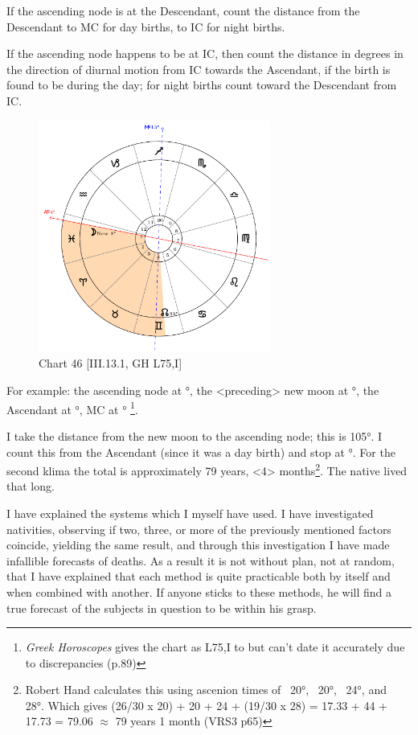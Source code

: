 If the ascending node is at the Descendant, count the distance from the Descendant to MC for day births, to IC for night births. 

If the ascending node happens to be at IC, then count the distance in degrees in the direction of diurnal motion
from IC towards the Ascendant, if the birth is found to be during the day; for night births count toward the Descendant from IC. 

\enlargethispage{2\baselineskip}
\clearpage
\begin{figure}
\centering
\includegraphics[width=0.68\textwidth]{charts/3_13_1}
\caption{Chart 46 [III.13.1, GH L75,I]}
\label{fig:chart46}
\end{figure}

For example: the ascending node at \Gemini\xspace 23°, the <preceding> new moon at \Pisces\xspace 8°, the Ascendant at \Pisces\xspace 4°, MC at \Sagittarius\xspace 13°
\footnote{\textit{Greek Horoscopes} gives the chart as L75,I to but can't date it accurately due to discrepancies (p.89)}. 

I take the distance from the new moon to the ascending node; this is 105°. I count this from the Ascendant (since it was a day birth) and stop at \Gemini\xspace 19°. For the second klima the total is approximately 79 years, <4> months\footnote{Robert Hand calculates this using ascenion times of \Pisces\, 20°, \Aries\, 20°, \Taurus\, 24°, and \Gemini\, 28°. Which gives (26/30 x 20) + 20 + 24 + (19/30 x 28) = 17.33 + 44 + 17.73 = 79.06 $\approx$ 79 years 1 month (VRS3 p65)}. The native lived that long.

I have explained the systems which I myself have used. I have investigated nativities, observing if two, three, or more of the previously mentioned factors coincide, yielding the same result, and through this investigation I have made infallible forecasts of deaths. As a result it is not without plan, not at random, that I have explained that each method is quite practicable both by itself and when combined with another. If anyone sticks to these methods, he will find a true forecast of the subjects in question to be within his grasp. 

